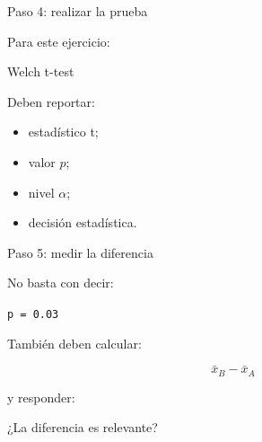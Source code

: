 \documentclass[aspectratio=169,11pt]{beamer}
\begin{document}

\begin{frame}{Paso 4: realizar la prueba}

Para este ejercicio:

\begin{center}

\Large
Welch t-test

\end{center}

Deben reportar:

\begin{itemize}

    \item estadístico t;

    \item valor $p$;

    \item nivel $\alpha$;

    \item decisión estadística.

\end{itemize}

\end{frame}


\begin{frame}{Paso 5: medir la diferencia}

No basta con decir:

\begin{center}

\texttt{p = 0.03}

\end{center}

También deben calcular:

\[
\bar{x}_B
-
\bar{x}_A
\]

y responder:

\begin{center}

\Large
¿La diferencia es relevante?
\end{center}

\end{frame}

\end{document}
